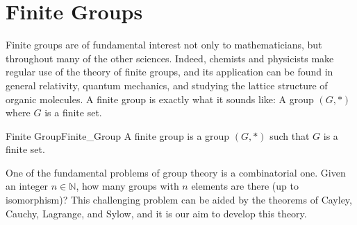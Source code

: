     \chapter{Finite Groups}
        Finite groups are of fundamental interest not only to mathematicians,
        but throughout many of the other sciences. Indeed, chemists and
        physicists make regular use of the theory of finite groups, and its
        application can be found in general relativity, quantum mechanics, and
        studying the lattice structure of organic molecules. A finite group is
        exactly what it sounds like: A group $(G,*)$ where $G$ is a finite set.
        \begin{fdefinition}{Finite Group}{Finite_Group}
            A finite group is a \gls{group} $(G,*)$ such that $G$ is a
            finite set.
        \end{fdefinition}
        One of the fundamental problems of group theory is a combinatorial one.
        Given an integer $n\in\mathbb{N}$, how many groups with $n$ elements are
        there (up to isomorphism)? This challenging problem can be aided by the
        theorems of Cayley, Cauchy, Lagrange, and Sylow, and it is our aim to
        develop this theory.
        
    \renewcommand{\PATH}{\OLDPATH}
\endgroup